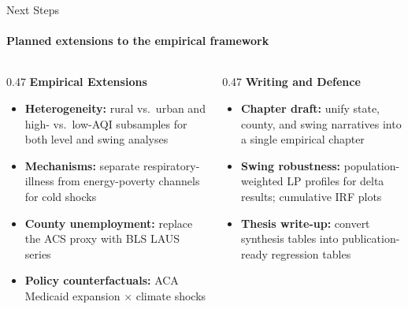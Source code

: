 \documentclass[aspectratio=169,11pt]{beamer}
\newcommand{\emphcolor}[1]{{\color{WarmOrange}\textbf{#1}}}
\newcommand{\tealtext}[1]{{\color{Teal}#1}}
\begin{document}
\begin{frame}{Next Steps}
  \framesubtitle{Planned extensions to the empirical framework}
  \begin{columns}[T]
    \begin{column}{0.47\textwidth}
      \textbf{\tealtext{Empirical Extensions}}\\[-0.1em]
      \footnotesize
      \begin{itemize}\itemsep0.18em
        \item \emphcolor{Heterogeneity:} rural vs.\ urban and high- vs.\ low-AQI subsamples for both level and swing analyses
        \item \emphcolor{Mechanisms:} separate respiratory-illness from energy-poverty channels for cold shocks
        \item \emphcolor{County unemployment:} replace the ACS proxy with BLS LAUS series
        \item \emphcolor{Policy counterfactuals:} ACA Medicaid expansion $\times$ climate shocks
      \end{itemize}
    \end{column}
    \begin{column}{0.47\textwidth}
      \textbf{\tealtext{Writing and Defence}}\\[-0.1em]
      \footnotesize
      \begin{itemize}\itemsep0.18em
        \item \emphcolor{Chapter draft:} unify state, county, and swing narratives into a single empirical chapter
        \item \emphcolor{Swing robustness:} population-weighted LP profiles for delta results; cumulative IRF plots
        \item \emphcolor{Thesis write-up:} convert synthesis tables into publication-ready regression tables
      \end{itemize}
    \end{column}
  \end{columns}
\end{frame}
\end{document}
